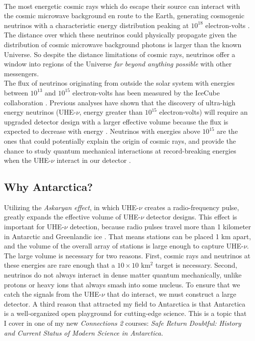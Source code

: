 \documentclass[../../../main.tex]{subfiles}
\begin{document}
\\
\vspace{0.25cm}
The most energetic cosmic rays which do escape their source can interact with the cosmic microwave background en route to the Earth, generating cosmogenic neutrinos with a characteristic energy distribution peaking at $10^{18}$ electron-volts \cite{10.1007/bf00645585} \cite{BERESINSKY1969423}. The distance over which these neutrinos could physically propagate given the distribution of cosmic microwave background photons is larger than the known Universe.  So despite the distance limitations of cosmic rays, neutrinos offer a window into regions of the Universe \textit{far beyond anything possible} with other messengers.
\\
\vspace{0.25cm}
The flux of neutrinos originating from outside the solar system with energies between $10^{13}$ and $10^{15}$ electron-volts has been measured by the IceCube collaboration \cite{PhysRevLett.111.021103}. Previous analyses have shown that the discovery of ultra-high energy neutrinos (UHE-$\nu$, energy greater than $10^{15}$ electron-volts) will require an upgraded detector design with a larger effective volume because the flux is expected to decrease with energy \cite{PhysRevD.98.062003}. Neutrinos with energies above $10^{15}$ are the ones that could potentially explain the origin of cosmic rays, and provide the chance to study quantum mechanical interactions at record-breaking energies when the UHE-$\nu$ interact in our detector \cite{Astro2020_1} \cite{Astro2020_2}.

\subsection{Why Antarctica?}
\label{sec:ant}

Utilizing the \textit{Askaryan effect}, in which UHE-$\nu$ creates a radio-frequency pulse, greatly expands the effective volume of UHE-$\nu$ detector designs.  This effect is important for UHE-$\nu$ detection, because radio pulses travel more than 1 kilometer in Antarctic and Greenlandic ice \cite{10.3189/2015jog14j214} \cite{10.3189/2015jog15j057} \cite{10.1002/2015rs005849} \cite{10.1016/j.astropartphys.2011.11.010}.  That means stations can be placed 1 km apart, and the volume of the overall array of stations is large enough to capture UHE-$\nu$.  The large volume is necessary for two reasons.  First, cosmic rays and neutrinos at these energies are rare enough that a $10 \times 10$ km$^2$ target is necessary.  Second, neutrinos do not always interact in dense matter quantum mechanically, unlike protons or heavy ions that always smash into some nucleus.  To ensure that we catch the signals from the UHE-$\nu$ that do interact, we must construct a large detector.  A third reason that attracted my field to Antarctica is that Antarctica is a well-organized open playground for cutting-edge science.  This is a topic that I cover in one of my new \textit{Connections 2} courses: \textit{Safe Return Doubtful: History and Current Status of Modern Science in Antarctica.}
\end{document}
